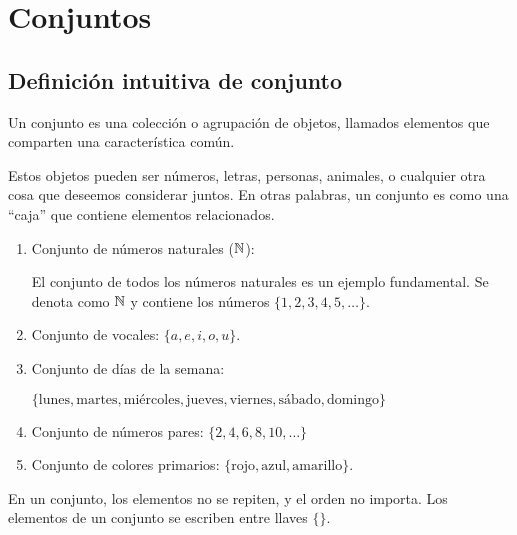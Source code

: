 \section{Conjuntos} \label{sec:conjuntos}


\subsection{Definición intuitiva de conjunto}
\vspace{1em}
\begin{fmd-definition}[Conjunto]
	Un \gls{conjunto} es una colección o agrupación de objetos, llamados \glspl{elemento} que comparten una característica común.
\end{fmd-definition}

Estos objetos pueden ser números, letras, personas, animales, o cualquier otra cosa que deseemos considerar juntos. En otras palabras, un conjunto es como una ``caja'' que contiene elementos relacionados.

\begin{fmd-example}[Conjuntos]
	\begin{enumerate}
		\item Conjunto de números naturales ($\mathbb{N}$):
		
		El conjunto de todos los números naturales es un ejemplo fundamental. Se denota como $\mathbb{N}$ y contiene los números $\{ 1, 2, 3, 4, 5, \ldots \}$.
		
		\item Conjunto de vocales: $\{a, e, i, o, u\}$.
		
		\item Conjunto de días de la semana:
		
		$\{ \text{lunes}, \text{martes}, \text{miércoles}, \text{jueves}, \text{viernes}, \text{sábado}, \text{domingo} \}$
		
		\item Conjunto de números pares: $\{2, 4, 6, 8, 10, \ldots \}$
		
		\item Conjunto de colores primarios: $\{\text{rojo}, \text{azul}, \text{amarillo}\}$.
	\end{enumerate}
\end{fmd-example}

\begin{lgnote}
	En un conjunto, los elementos no se repiten, y el orden no importa. Los elementos de un conjunto se escriben entre llaves $\{ \}$.
\end{lgnote}


